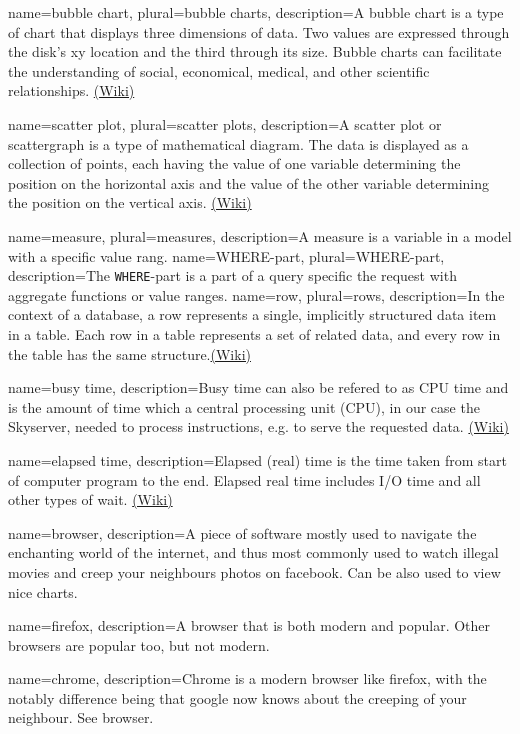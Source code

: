 {
  name=bubble chart,
  plural=bubble charts,
  description={A bubble chart is a type of chart that displays three 
  dimensions of data. Two values are expressed through the disk's xy location and the third 
  through its size. Bubble charts can facilitate the understanding of social,
economical, medical, and other scientific relationships. \href{http://en.wikipedia.org/wiki/Bubble_chart}{(Wiki)}}
}

{
  name=scatter plot,
  plural=scatter plots,
  description={A scatter plot or scattergraph is a type of mathematical diagram. 
  The data is displayed as a collection of points, each having the value of one 
  variable determining the position on the horizontal axis and the value of the other 
  variable determining the position on the vertical axis. \href{http://en.wikipedia.org/wiki/Scatter_plot}{(Wiki)}}
}

{
  name=measure,
  plural=measures,
  description={A measure is a variable in a model with a specific value rang.}
}
{
  name=WHERE-part,
  plural=WHERE-part,
  description={The \texttt{WHERE}-part is a part of a \gls{query} specific the request with
   aggregate functions or value ranges.}
}
{
  name=row,
  plural=rows,
  description={In the context of a database, a row represents a single, implicitly 
  structured data item in a table. Each row in a table represents a set of related data, 
  and every row in the table has the same structure.\href{(http://en.wikipedia.org/wiki/Row_(database))}{(Wiki)}}
}

{
  name=busy time,
  description={Busy time can also be refered to as CPU time and is the amount of time which a 
  central processing unit (CPU), in our case the Skyserver, needed to process instructions,
   e.g. to serve the requested data. \href{(http://en.wikipedia.org/wiki/CPU_time)}{(Wiki)}}
}

{
  name=elapsed time,
  description={Elapsed (real) time is the time taken from start of computer program to the end. 
  Elapsed real time includes I/O time and all other types of wait. 
  \href{(http://en.wikipedia.org/wiki/Elapsed_real_time)}{(Wiki)}}
}


{
  name=browser,
  description={A piece of software mostly used to navigate the enchanting world of the internet, and thus most commonly
used to watch illegal movies and creep your neighbours photos on facebook. Can be also used to view nice charts.}
}

{
  name=firefox,
  description={A browser that is both modern and popular. Other browsers are popular too, but not modern. }
}

{
  name=chrome,
  description={Chrome is a modern browser like firefox, with the notably difference being that google now knows about the
creeping of your neighbour. See browser.}
}


